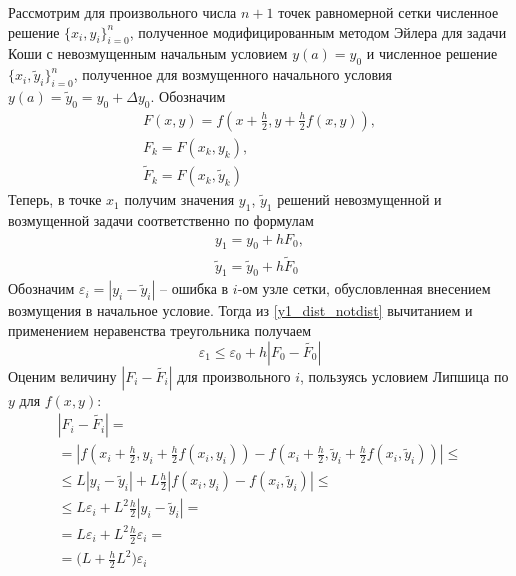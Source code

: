\documentclass[a4paper, 12pt]{article}
\theoremstyle{mythm}
\begin{document}
	Рассмотрим для произвольного числа $n+1$ точек равномерной сетки численное решение $\{x_i, y_i\}_{i=0}^n$, полученное модифицированным методом Эйлера для задачи Коши с невозмущенным начальным условием $y(a)=y_0$ и численное решение $\{x_i, \widetilde{y}_i\}_{i=0}^n$, полученное для возмущенного начального условия $y(a)=\widetilde{y}_0=y_0 + \Delta y_0$. Обозначим
	\begin{equation}
		\begin{gathered}
			F(x,y) = f(x + \frac{h}{2}, y+\frac{h}{2}f(x,y)),\\
			F_k = F(x_k, y_k),\\
			\widetilde{F}_k = F(x_k, \widetilde{y}_k)
		\end{gathered}
	\end{equation}
	Теперь, в точке $x_1$ получим значения $y_1$, $\widetilde{y}_1$ решений невозмущенной и возмущенной задачи соответственно по формулам
	\begin{equation} \label{y1_dist_notdist}
		\begin{gathered}
			y_1 = y_0 + hF_0,\\
			\widetilde{y}_1 = \widetilde{y}_0 + h\widetilde{F}_0
		\end{gathered}
	\end{equation}
	Обозначим $\varepsilon_i = |y_i - \widetilde{y}_i|$ -- ошибка в $i$-ом узле сетки, обусловленная внесением возмущения в начальное условие. Тогда из \eqref{y1_dist_notdist} вычитанием и применением неравенства треугольника получаем
	\begin{equation} \label{epsilons10}
		\varepsilon_1 \leq \varepsilon_0  + h|F_0-\widetilde{F_0}|
	\end{equation}
	Оценим величину $|F_i-\widetilde{F_i}|$ для произвольного $i$, пользуясь условием Липшица по $y$ для $f(x,y)$:
	\begin{equation}
		\begin{gathered}
			|F_i-\widetilde{F_i}|=\\=|f(x_i + \frac{h}{2}, y_i+\frac{h}{2}f(x_i,y_i))-f(x_i + \frac{h}{2}, \widetilde{y}_i+\frac{h}{2}f(x_i,\widetilde{y}_i))| \leq \\ \leq L|y_i-\widetilde{y}_i|+L\frac{h}{2}|f(x_i,y_i)-f(x_i,\widetilde{y}_i)| \leq \\ \leq
			L\varepsilon_i + L^2\frac{h}{2}|y_i-\widetilde{y}_i| = \\ =
			L\varepsilon_i + L^2\frac{h}{2}\varepsilon_i = \\ =
			\bigg(L + \frac{h}{2}L^2\bigg)\varepsilon_i
		\end{gathered}
	\end{equation}
\end{document}
